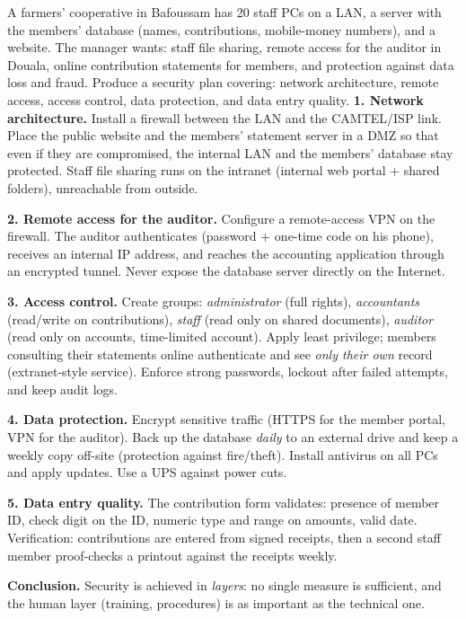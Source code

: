 \documentclass[11pt]{article}
\newcommand{\cle}[1]{{\popxbold\color{popdark}#1}}
\begin{document}
\begin{exoresolu}
A farmers' cooperative in Bafoussam has 20 staff PCs on a LAN, a server with the members' database (names, contributions, mobile-money numbers), and a website. The manager wants: staff file sharing, remote access for the auditor in Douala, online contribution statements for members, and protection against data loss and fraud. Produce a security plan covering: network architecture, remote access, access control, data protection, and data entry quality.
\tcblower
\textbf{1. Network architecture.} Install a \cle{firewall} between the LAN and the CAMTEL/ISP link. Place the public website and the members' statement server in a \cle{DMZ} so that even if they are compromised, the internal LAN and the members' database stay protected. Staff file sharing runs on the \cle{intranet} (internal web portal + shared folders), unreachable from outside.

\textbf{2. Remote access for the auditor.} Configure a \cle{remote-access VPN} on the firewall. The auditor authenticates (password + one-time code on his phone), receives an internal IP address, and reaches the accounting application through an encrypted tunnel. Never expose the database server directly on the Internet.

\textbf{3. Access control.} Create groups: \emph{administrator} (full rights), \emph{accountants} (read/write on contributions), \emph{staff} (read only on shared documents), \emph{auditor} (read only on accounts, time-limited account). Apply least privilege; members consulting their statements online authenticate and see \emph{only their own} record (extranet-style service). Enforce strong passwords, lockout after failed attempts, and keep audit logs.

\textbf{4. Data protection.} Encrypt sensitive traffic (HTTPS for the member portal, VPN for the auditor). Back up the database \emph{daily} to an external drive and keep a weekly copy off-site (protection against fire/theft). Install antivirus on all PCs and apply updates. Use a UPS against power cuts.

\textbf{5. Data entry quality.} The contribution form validates: presence of member ID, check digit on the ID, numeric type and range on amounts, valid date. Verification: contributions are entered from signed receipts, then a second staff member proof-checks a printout against the receipts weekly.

\textbf{Conclusion.} Security is achieved in \emph{layers}: no single measure is sufficient, and the human layer (training, procedures) is as important as the technical one.
\end{exoresolu}
\end{document}
